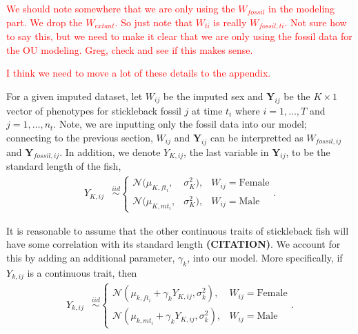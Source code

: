 \documentclass[
  12pt,
]{article}
\begin{document}
\textcolor{red}{We should note somewhere that we are only using the $W_{fossil}$ in the modeling part.  We drop the $W_{extant}$.  So just note that $W_{ti}$ is really $W_{fossil,ti}$.  Not sure how to say this, but we need to make it clear that we are only using the fossil data for the OU modeling.  Greg, check and see if this makes sense.}

\textcolor{red}{I think we need to move a lot of these details to the appendix.  }

For a given imputed dataset, let \(W_{ij}\) be the imputed sex and
\(\boldsymbol{Y}_{ij}\) be the \(K \times 1\) vector of phenotypes for
stickleback fossil \(j\) at time \(t_i\) where \(i = 1, \ldots, T\) and
\(j = 1,\ldots,n_{t}\). Note, we are inputting only the fossil data into
our model; connecting to the previous section, \(W_{ij}\) and
\(\boldsymbol{Y}_{ij}\) can be interpretted as \(W_{fossil,ij}\) and
\(\boldsymbol{Y}_{fossil,ij}\). In addition, we denote \(Y_{K,ij}\), the
last variable in \(\boldsymbol{Y}_{ij}\), to be the standard length of
the fish, \begin{align}
{Y}_{K,ij} & \overset{iid}{\sim}\left\{\begin{array}{lll} \mathcal{N}(\mu_{K,ft_i},&\sigma_{K}^2), & W_{ij} = \text{Female} \\ \mathcal{N}(\mu_{K,mt_i},&\sigma_{K}^2), & W_{ij} = \text{Male} \end{array}\right..
\label{eq:stl}
\end{align}

It is reasonable to assume that the other continuous traits of
stickleback fish will have some correlation with its standard length
\textbf{(CITATION)}. We account for this by adding an additional
parameter, \(\gamma_k\), into our model. More specifically, if
\(Y_{k,ij}\) is a continuous trait, then \begin{align}
{Y}_{k,ij} & \overset{iid}{\sim}\left\{\begin{array}{llll} \mathcal{N}(\mu_{k,ft_i} + \gamma_kY_{K,ij},\sigma_k^2), & W_{ij} = \text{Female} \\ \mathcal{N}(\mu_{k,mt_i} + \gamma_kY_{K,ij},\sigma_k^2), & W_{ij} = \text{Male} \end{array}\right..
\label{eq:cont}
\end{align}
\end{document}
